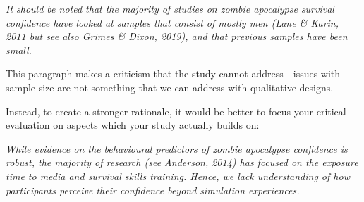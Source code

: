 \documentclass[
  english,
  letterpaper,
  DIV=11,
  numbers=noendperiod]{scrreprt}
\begin{document}
\begin{tcolorbox}[enhanced jigsaw, breakable, bottomtitle=1mm, leftrule=.75mm, opacityback=0, colbacktitle=quarto-callout-caution-color!10!white, opacitybacktitle=0.6, toprule=.15mm, colback=white, left=2mm, coltitle=black, bottomrule=.15mm, titlerule=0mm, title={Show me Example 2: Making criticisms that are outwith the scope of your
study}, toptitle=1mm, colframe=quarto-callout-caution-color-frame, arc=.35mm, rightrule=.15mm]

\emph{It should be noted that the majority of studies on zombie
apocalypse survival confidence have looked at samples that consist of
mostly men (Lane \& Karin, 2011 but see also Grimes \& Dixon, 2019), and
that previous samples have been small.}

This paragraph makes a criticism that the study cannot address - issues
with sample size are not something that we can address with qualitative
designs.

Instead, to create a stronger rationale, it would be better to focus
your critical evaluation on aspects which your study actually builds on:

\emph{While evidence on the behavioural predictors of zombie apocalypse
confidence is robust, the majority of research (see Anderson, 2014) has
focused on the exposure time to media and survival skills training.
Hence, we lack understanding of how participants perceive their
confidence beyond simulation experiences.}

\end{tcolorbox}
\end{document}
